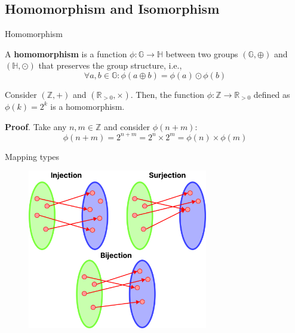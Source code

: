 \documentclass{beamer}
\begin{document}
  \subsection{Homomorphism and Isomorphism}

  \begin{frame}{Homomorphism}
    \begin{definition}
      A \textbf{homomorphism} is a function $\phi: \mathbb{G} \rightarrow \mathbb{H}$ between two groups $(\mathbb{G}, \oplus)$ and $(\mathbb{H}, \odot)$ that preserves the group structure, i.e., 
      \begin{equation*}
        \forall a,b \in \mathbb{G}: \phi(a \oplus b) = \phi(a) \odot \phi(b)
      \end{equation*}
    \end{definition}
    \pause

    \begin{example}
      Consider $(\mathbb{Z}, +)$ and $(\mathbb{R}_{>0}, \times)$. Then, the function $\phi: \mathbb{Z} \rightarrow \mathbb{R}_{>0}$ defined as $\phi(k) = 2^k$ is a homomorphism.\pause
    \end{example}

    \textbf{Proof}. Take any $n,m \in \mathbb{Z}$ and consider $\phi(n+m)$:
    \begin{equation*}
      \phi(n+m) = 2^{n+m} = 2^n \times 2^m = \phi(n) \times \phi(m)
    \end{equation*}
  \end{frame}

  \begin{frame}{Mapping types}
    \begin{figure}
      \includegraphics[width=0.7\textwidth]{images/lecture_1/mapping.pdf}
      \label{fig:mappings}
    \end{figure}
  \end{frame}
\end{document}
